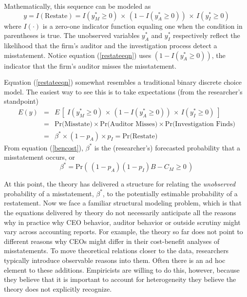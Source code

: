 Mathematically, this sequence can be modeled as
\begin{equation}\label{restateeqn}
 y = I(\mbox{Restate}) = I(y^*_M \ge 0) \, \times\, (1 - I(y^*_A \ge 0)) \, \times\, I(y^*_I \ge 0)
\end{equation}
where $I(\cdot)$ is a zero-one indicator function equaling one when the condition in parentheses is true.
The unobserved variables $y^*_A$ and $y^*_I$ respectively reflect the likelihood that the firm's
auditor and the investigation process detect a misstatement. Notice equation (\ref{restateeqn})
uses $(1 - I(y^*_A \ge 0))$, the indicator that the firm's auditor misses the misstatement.

Equation (\ref{restateeqn}) somewhat resembles a traditional binary discrete choice model. The easiest
way to see this is to take expectations (from the researcher's standpoint)
\begin{equation} \label{equilpr}
\begin{array}{lcl}
 E(y) & = & E\, \left[\; I(y^*_M \ge 0) \, \times\, (1 - I(y^*_A \ge 0)) \, \times\, I(y^*_I \ge 0) \; \right]\\[1em]
 & = &  \mbox{Pr(Misstate)} \times \mbox{Pr(Auditor Misses)} \times
\mbox{Pr(Investigation Finds)}\\[1em]
& = & \beta^* \times (1-p_A) \times p_{I} = \mbox{Pr(Restate)}
\end{array}\end{equation}
From equation (\ref{bencost}), $\beta^*$ is the (researcher's) forecasted probability that a misstatement occurs, or
\begin{equation}\label{betaplus}
\beta^*= \mbox{Pr}\left(\, (1 - p_A)(1 - p_I) B - C_M \ge 0 \,\right)
\end{equation}

At this point, the theory has delivered a structure for relating the \emph{unobserved} probability of a misstatement, $\beta^*$, to the potentially estimable probability of a restatement.
Now we face a familiar structural modeling problem, which is that the equations delivered by theory do not necessarily anticipate all the reasons why in practice why CEO behavior, auditor behavior or outside scrutiny might vary across accounting reports.
For example, the theory so far does not point to different reasons why CEOs might differ in their cost-benefit analyses of misstatements. 
To move theoretical relations closer to the data, researchers typically introduce observable reasons into them. 
Often there is an ad hoc element to these additions. 
Empiricists are willing to do this, however, because they believe that it is important to account for heterogeneity they believe the theory does not explicitly recognize.

